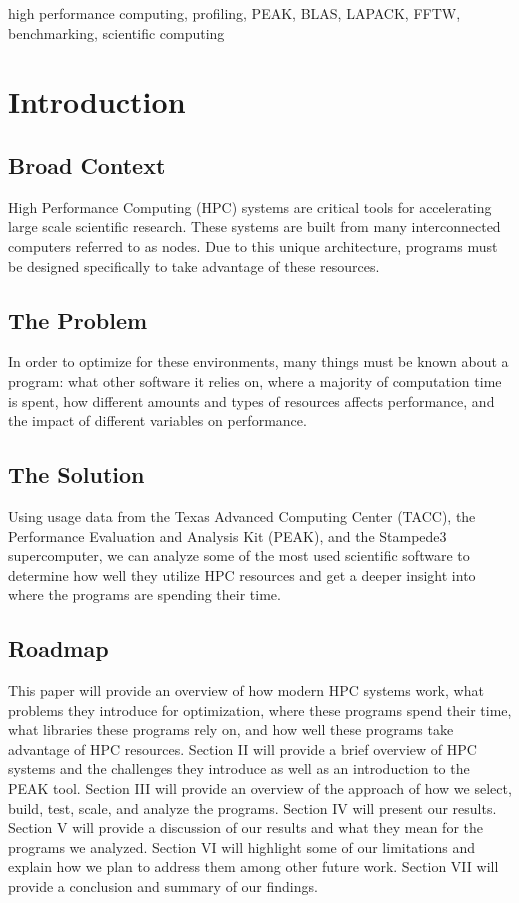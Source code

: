\documentclass[conference]{IEEEtran}
\begin{document}
\begin{IEEEkeywords}
high performance computing, profiling, PEAK, BLAS, LAPACK, FFTW, benchmarking, scientific computing
\end{IEEEkeywords}

\section{Introduction}

\subsection{Broad Context}
High Performance Computing (HPC) systems are critical tools for accelerating large scale scientific research. These systems are built from many interconnected computers referred to as nodes. Due to this unique architecture, programs must be designed specifically to take advantage of these resources.

\subsection{The Problem}
In order to optimize for these environments, many things must be known about a program: what other software it relies on, where a majority of computation time is spent, how different amounts and types of resources affects performance, and the impact of different variables on performance.

\subsection{The Solution}
Using usage data from the Texas Advanced Computing Center (TACC), the Performance Evaluation and Analysis Kit (PEAK), and the Stampede3 supercomputer, we can analyze some of the most used scientific software to determine how well they utilize HPC resources and get a deeper insight into where the programs are spending their time.

\subsection{Roadmap}
This paper will provide an overview of how modern HPC systems work, what problems they introduce for optimization, where these programs spend their time, what libraries these programs rely on, and how well these programs take advantage of HPC resources. Section II will provide a brief overview of HPC systems and the challenges they introduce as well as an introduction to the PEAK tool. Section III will provide an overview of the approach of how we select, build, test, scale, and analyze the programs. Section IV will present our results. Section V will provide a discussion of our results and what they mean for the programs we analyzed. Section VI will highlight some of our limitations and explain how we plan to address them among other future work. Section VII will provide a conclusion and summary of our findings.
\end{document}
